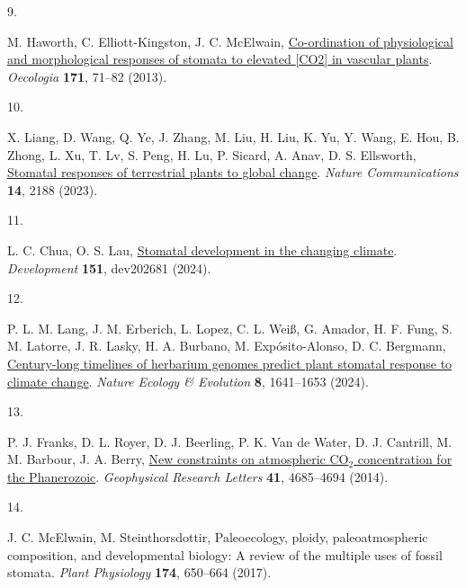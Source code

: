 \documentclass[
  letterpaper,
  DIV=11,
  numbers=noendperiod]{scrartcl}
\newlength{\cslhangindent}
\newlength{\csllabelwidth}
\newenvironment{CSLReferences}[2] %
 {\begin{list}{}{%
  \setlength{\itemindent}{0pt}
  \setlength{\leftmargin}{0pt}
  \setlength{\parsep}{0pt}
  \ifodd #1
   \setlength{\leftmargin}{\cslhangindent}
   \setlength{\itemindent}{-1\cslhangindent}
  \fi
  \setlength{\itemsep}{#2\baselineskip}}}
 {\end{list}}
\newcommand{\CSLLeftMargin}[1]{\parbox[t]{\csllabelwidth}{\strut#1\strut}}
\newcommand{\CSLRightInline}[1]{\parbox[t]{\linewidth - \csllabelwidth}{\strut#1\strut}}
\begin{document}
\begin{CSLReferences}{0}{1}
\CSLLeftMargin{9. }%
\CSLRightInline{M. Haworth, C. Elliott-Kingston, J. C. McElwain,
\href{https://doi.org/10.1007/s00442-012-2406-9}{Co-ordination of
physiological and morphological responses of stomata to elevated
{[}{CO2}{]} in vascular plants}. \emph{Oecologia} \textbf{171}, 71--82
(2013).}

\CSLLeftMargin{10. }%
\CSLRightInline{X. Liang, D. Wang, Q. Ye, J. Zhang, M. Liu, H. Liu, K.
Yu, Y. Wang, E. Hou, B. Zhong, L. Xu, T. Lv, S. Peng, H. Lu, P. Sicard,
A. Anav, D. S. Ellsworth,
\href{https://doi.org/10.1038/s41467-023-37934-7}{Stomatal responses of
terrestrial plants to global change}. \emph{Nature Communications}
\textbf{14}, 2188 (2023).}

\CSLLeftMargin{11. }%
\CSLRightInline{L. C. Chua, O. S. Lau,
\href{https://doi.org/10.1242/dev.202681}{Stomatal development in the
changing climate}. \emph{Development} \textbf{151}, dev202681 (2024).}

\CSLLeftMargin{12. }%
\CSLRightInline{P. L. M. Lang, J. M. Erberich, L. Lopez, C. L. Weiß, G.
Amador, H. F. Fung, S. M. Latorre, J. R. Lasky, H. A. Burbano, M.
Expósito-Alonso, D. C. Bergmann,
\href{https://doi.org/10.1038/s41559-024-02481-x}{Century-long timelines
of herbarium genomes predict plant stomatal response to climate change}.
\emph{Nature Ecology \& Evolution} \textbf{8}, 1641--1653 (2024).}

\CSLLeftMargin{13. }%
\CSLRightInline{P. J. Franks, D. L. Royer, D. J. Beerling, P. K. Van de
Water, D. J. Cantrill, M. M. Barbour, J. A. Berry,
\href{https://doi.org/10.1002/2014GL060457}{New constraints on
atmospheric {CO}\(_{\textrm{2}}\) concentration for the {Phanerozoic}}.
\emph{Geophysical Research Letters} \textbf{41}, 4685--4694 (2014).}

\CSLLeftMargin{14. }%
\CSLRightInline{J. C. McElwain, M. Steinthorsdottir, Paleoecology,
ploidy, paleoatmospheric composition, and developmental biology: A
review of the multiple uses of fossil stomata. \emph{Plant Physiology}
\textbf{174}, 650--664 (2017).}


\end{CSLReferences}
\end{document}
